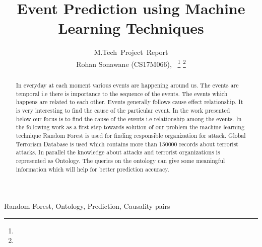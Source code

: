 \documentclass[journal,onecolumn,11pt]{IEEEtran}
\begin{document}
\title{Event Prediction using Machine Learning Techniques}

\author{M.Tech~Project~Report\\
        Rohan Sonawane (CS17M066),~%
\thanks{}%
\thanks{}%
}

\maketitle

\begin{abstract}
In everyday at each moment various events are happening around us. The events are temporal i.e there is importance to the sequence of the events. The events which happens are related to each other. Events generally follows cause effect relationship. It is very interesting to find the cause of the particular event. In the work presented below our focus is to find the cause of the events i.e relationship among the events. In the following work as a first step towards solution of our problem the machine learning technique Random Forest is used for finding responsible organization for attack. Global Terrorism Database is used which contains more than 150000 records about terrorist attacks. In parallel the knowledge about attacks and terrorist organizations is represented as Ontology. The queries on the ontology can give some meaningful information which will help for better prediction accuracy.
\end{abstract}

\begin{IEEEkeywords}
Random Forest, Ontology, Prediction, Causality pairs
\end{IEEEkeywords}

\IEEEpeerreviewmaketitle
\end{document}
